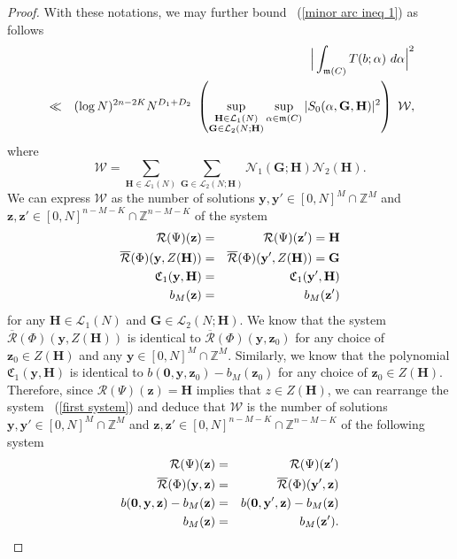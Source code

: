 \documentclass[12pt]{amsart}
\theoremstyle{definition}
\theoremstyle{remark}
\numberwithin{equation}{section}
\begin{document}
\begin{proof}
With these notations, we may further bound ~(\ref{minor arc ineq 1}) as follows
\begin{eqnarray}
\label{minor arc ineq 2}
&&\Big{|} \int_{\mathfrak{m}(C)} T({b}; {\alpha} ) \ {d} {\alpha}  \Big{|}^2
\\
&\ll&
(\log N)^{2n - 2K}  N^{D_1+D_2} \ \left( \sup_{\substack {\mathbf{H} \in \mathcal{L}_1(N) \\ \mathbf{G} \in \mathcal{L}_2(N ; \mathbf{H}) }}  \sup_{\alpha \in \mathfrak{m}(C) } | S_0 (\alpha, \mathbf{G}, \mathbf{H} ) |^2 \right)
\ \mathcal{W},
\notag
\end{eqnarray}
where
$$
\mathcal{W} = \sum_{\mathbf{H} \in \mathcal{L}_1(N)} \sum_{\mathbf{G} \in \mathcal{L}_2(N; \mathbf{H})} \mathcal{N}_1 (\mathbf{G}; \mathbf{H})  \mathcal{N}_2 (\mathbf{H}).
$$
We can express $\mathcal{W}$ as the number of solutions $\mathbf{y}, \mathbf{y}'  \in [0,N]^M \cap \mathbb{Z}^M$
and $\mathbf{z}, \mathbf{z}' \in [0,N]^{n-M-K} \cap \mathbb{Z}^{n-M-K} $ of the system
\begin{eqnarray}
{\mathcal{R}}(\Psi) ( \mathbf{z}) &=& {\mathcal{R}}(\Psi) (\mathbf{z}') = \mathbf{H}
\label{first system}
\\
\overline{\mathcal{R}}(\Phi) (\mathbf{y},  Z(\mathbf{H})) &=& \overline{\mathcal{R}}(\Phi) (\mathbf{y}', Z(\mathbf{H}))= \mathbf{G}
\notag
\\
\mathfrak{C}_1 (\mathbf{y}, \mathbf{H}  )  &=&  \mathfrak{C}_1 (\mathbf{y}', \mathbf{H}  )
\notag
\\
{b}_M( \mathbf{z} ) &=& {b}_M( \mathbf{z}' )
\notag
\end{eqnarray}
for any $\mathbf{H}\in \mathcal{L}_1(N)$ and $\mathbf{G}\in \mathcal{L}_2(N; \mathbf{H})$.
We know that the system $\overline{\mathcal{R}}(\Phi) (\mathbf{y},  Z(\mathbf{H}))$ is identical to $\overline{\mathcal{R}}(\Phi) (\mathbf{y},  \mathbf{z}_0)$ for any choice of $\mathbf{z}_0 \in Z(\mathbf{H})$ and any $\mathbf{y} \in [0,N]^M \cap \mathbb{Z}^M$. Similarly, we know that the polynomial
$\mathfrak{C}_1 (\mathbf{y}, \mathbf{H})$ is identical to $b(\mathbf{0}, \mathbf{y}, \mathbf{z}_0) - b_M(\mathbf{z}_0)$ for
any choice of $\mathbf{z}_0 \in Z(\mathbf{H})$.
Therefore, since ${\mathcal{R}}(\Psi) (\mathbf{z}) = \mathbf{H}$
implies that $z \in Z(\mathbf{H})$, we can rearrange the system ~(\ref{first system}) and
deduce that $\mathcal{W}$ is the number of solutions $\mathbf{y}, \mathbf{y}'  \in [0,N]^M \cap \mathbb{Z}^M$
and $\mathbf{z}, \mathbf{z}' \in [0,N]^{n-M-K} \cap \mathbb{Z}^{n-M-K} $ of the following system
\begin{eqnarray}
\label{second system}
{\mathcal{R}}(\Psi) ( \mathbf{z}) &=& {\mathcal{R}}(\Psi) (\mathbf{z}')
\\
\overline{\mathcal{R}}(\Phi) (\mathbf{y},  \mathbf{z} ) &=& \overline{\mathcal{R}}(\Phi) (\mathbf{y}', \mathbf{z} )
\notag
\\
{b}(\mathbf{0}, \mathbf{y}, \mathbf{z}) - {b}_M (\mathbf{z} )  &=&  {b}(\mathbf{0}, \mathbf{y}', \mathbf{z}) - {b}_M (\mathbf{z} )
\notag
\\
{b}_M( \mathbf{z} ) &=& {b}_M( \mathbf{z}' ).
\notag
\end{eqnarray}


\end{proof}
\end{document}
